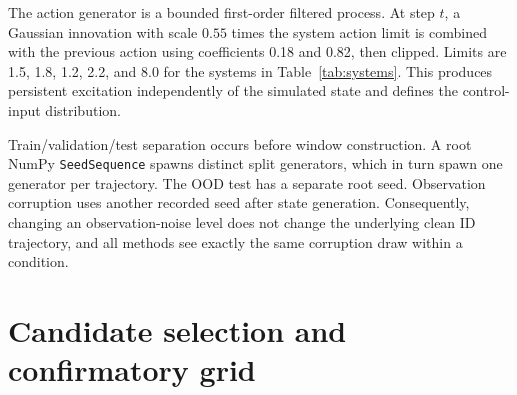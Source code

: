 \begin{table}[ht]
\centering
\scriptsize
\caption{Complete independently sampled physical-parameter intervals. Symbols
follow Table~\ref{tab:systems}; $g_u$ is the Van der Pol control gain.}
\label{tab:parameter-ranges}
\end{table}

The action generator is a bounded first-order filtered process. At step $t$, a Gaussian innovation with scale $0.55$ times the system action limit is combined with the previous action using coefficients 0.18 and 0.82, then clipped. Limits are 1.5, 1.8, 1.2, 2.2, and 8.0 for the systems in Table~\ref{tab:systems}. This produces persistent excitation independently of the simulated state and defines the control-input distribution.

Train/validation/test separation occurs before window construction. A root NumPy \texttt{SeedSequence} spawns distinct split generators, which in turn spawn one generator per trajectory. The OOD test has a separate root seed. Observation corruption uses another recorded seed after state generation. Consequently, changing an observation-noise level does not change the underlying clean ID trajectory, and all methods see exactly the same corruption draw within a condition.

\section{Candidate selection and confirmatory grid}

